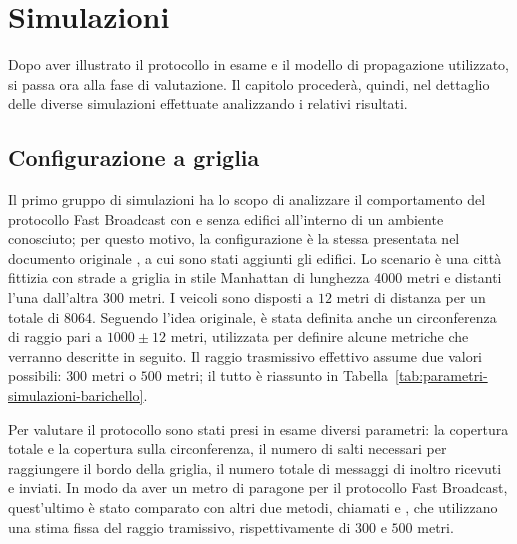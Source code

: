 
\chapter{Simulazioni}\label{chap:simulazioni}
Dopo aver illustrato il protocollo in esame e il modello di propagazione utilizzato, si passa ora alla fase di valutazione.
Il capitolo procederà, quindi, nel dettaglio delle diverse simulazioni effettuate analizzando i relativi risultati.
%
\section{Configurazione a griglia}\label{sec:configurazione-griglia}
Il primo gruppo di simulazioni ha lo scopo di analizzare il comportamento del protocollo Fast Broadcast con e senza edifici all'interno
di un ambiente conosciuto;
per questo motivo, la configurazione è la stessa presentata nel documento originale \cite{Barichello2017propagazione}, a cui sono stati aggiunti gli edifici.
Lo scenario è una città fittizia con strade a griglia in stile Manhattan di lunghezza $4000$ metri e distanti l'una dall'altra $300$ metri.
I veicoli sono disposti a $12$ metri di distanza per un totale di $8064$.
Seguendo l'idea originale, è stata definita anche un circonferenza di raggio pari a $1000\pm12$ metri, utilizzata per definire alcune metriche che verranno descritte in seguito.
Il raggio trasmissivo effettivo assume due valori possibili: $300$ metri o $500$ metri;
il tutto è riassunto in Tabella~\ref{tab:parametri-simulazioni-barichello}.

Per valutare il protocollo sono stati presi in esame diversi parametri: la copertura totale e la copertura sulla circonferenza,
il numero di salti necessari per raggiungere il bordo della griglia, il numero totale di messaggi di inoltro ricevuti e inviati.
In modo da aver un metro di paragone per il protocollo Fast Broadcast, quest'ultimo è stato comparato con altri due metodi, chiamati \statica e \staticb,
che utilizzano una stima fissa del raggio tramissivo, rispettivamente di $300$ e $500$ metri.


